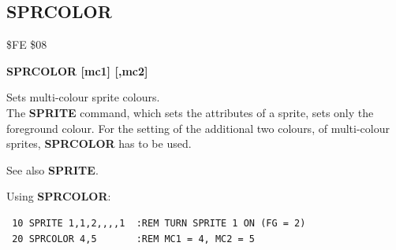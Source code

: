 
\newpage
\subsection{SPRCOLOR}
\begin{description}[leftmargin=2cm,style=nextline]
\item [Token:] \$FE \$08
\item [Format:] {\bf SPRCOLOR [mc1] [,mc2]}
\item [Usage:]  Sets multi-colour sprite colours. \\
                The {\bf SPRITE} command, which sets the
                attributes of a sprite, sets only the foreground
                colour. For the setting of the  additional two colours,
                of multi-colour sprites, {\bf SPRCOLOR} has
                to be used.

\item [Remarks:] See also {\bf SPRITE}.

\item [Example:] Using {\bf SPRCOLOR}:
\begin{tcolorbox}[colback=black,coltext=white]
\verbatimfont{\codefont}
\begin{verbatim}
 10 SPRITE 1,1,2,,,,1  :REM TURN SPRITE 1 ON (FG = 2)
 20 SPRCOLOR 4,5       :REM MC1 = 4, MC2 = 5
\end{verbatim}
\end{tcolorbox}
\end{description}


\newpage
